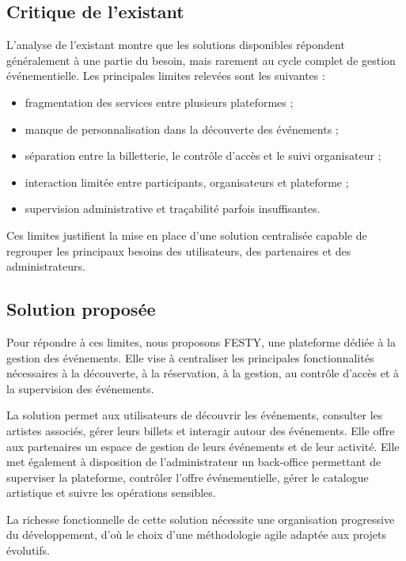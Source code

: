 \subsection{Critique de l’existant}


L’analyse de l’existant montre que les solutions disponibles répondent généralement à une partie du besoin, mais rarement au cycle complet de gestion événementielle. Les principales limites relevées sont les suivantes :


\begin{itemize}
  \item fragmentation des services entre plusieurs plateformes ;
  \item manque de personnalisation dans la découverte des événements ;
  \item séparation entre la billetterie, le contrôle d’accès et le suivi organisateur ;
  \item interaction limitée entre participants, organisateurs et plateforme ;
  \item supervision administrative et traçabilité parfois insuffisantes.
\end{itemize}


Ces limites justifient la mise en place d’une solution centralisée capable de regrouper les principaux besoins des utilisateurs, des partenaires et des administrateurs.


\subsection{Solution proposée}


Pour répondre à ces limites, nous proposons FESTY, une plateforme dédiée à la gestion des événements. Elle vise à centraliser les principales fonctionnalités nécessaires à la découverte, à la réservation, à la gestion, au contrôle d’accès et à la supervision des événements.


La solution permet aux utilisateurs de découvrir les événements, consulter les artistes associés, gérer leurs billets et interagir autour des événements. Elle offre aux partenaires un espace de gestion de leurs événements et de leur activité. Elle met également à disposition de l’administrateur un back-office permettant de superviser la plateforme, contrôler l’offre événementielle, gérer le catalogue artistique et suivre les opérations sensibles.


La richesse fonctionnelle de cette solution nécessite une organisation progressive du développement, d’où le choix d’une méthodologie agile adaptée aux projets évolutifs.


